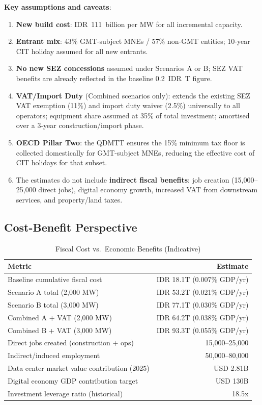 \documentclass[11pt,a4paper]{article}
\begin{document}
\noindent\textbf{Key assumptions and caveats}:
\begin{enumerate}[leftmargin=*]
    \item \textbf{New build cost}: IDR~111~billion per MW for all incremental capacity.
    \item \textbf{Entrant mix}: 43\% GMT-subject MNEs / 57\% non-GMT entities; 10-year CIT holiday assumed for all new entrants.
    \item \textbf{No new SEZ concessions} assumed under Scenarios A or B; SEZ VAT benefits are already reflected in the baseline 0.2~IDR~T figure.
    \item \textbf{VAT/Import Duty} (Combined scenarios only): extends the existing SEZ VAT exemption (11\%) and import duty waiver (2.5\%) universally to all operators; equipment share assumed at 35\% of total investment; amortised over a 3-year construction/import phase.
    \item \textbf{OECD Pillar Two}: the QDMTT ensures the 15\% minimum tax floor is collected domestically for GMT-subject MNEs, reducing the effective cost of CIT holidays for that subset.
    \item The estimates do not include \textbf{indirect fiscal benefits}: job creation (15,000--25,000 direct jobs), digital economy growth, increased VAT from downstream services, and property/land taxes.
\end{enumerate}

\subsection{Cost-Benefit Perspective}

\begin{table}[H]
\centering
\caption{Fiscal Cost vs.\ Economic Benefits (Indicative)}
\begin{tabular}{p{6cm}r}
\toprule
\textbf{Metric} & \textbf{Estimate} \\
\midrule
Baseline cumulative fiscal cost               & IDR 18.1T (0.007\% GDP/yr) \\
Scenario A total (2,000 MW)                   & IDR 53.2T (0.021\% GDP/yr) \\
Scenario B total (3,000 MW)                   & IDR 77.1T (0.030\% GDP/yr) \\
Combined A + VAT (2,000 MW)                   & IDR 64.2T (0.038\% GDP/yr) \\
Combined B + VAT (3,000 MW)                   & IDR 93.3T (0.055\% GDP/yr) \\
Direct jobs created (construction + ops)       & 15,000--25,000 \\
Indirect/induced employment                   & 50,000--80,000 \\
Data center market value contribution (2025)   & USD 2.81B \\
Digital economy GDP contribution target        & USD 130B \\
Investment leverage ratio (historical)         & 18.5x \\
\bottomrule
\end{tabular}
\end{table}
\end{document}
